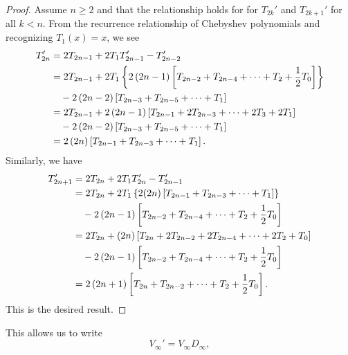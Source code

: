 \begin{proof}
Assume $n\ge2$ and that the relationship holds for
for $T_{2k}'$ and $T_{2k+1}'$ for all $k<n$.
From the recurrence relationship of Chebyshev polynomials
and recognizing $T_{1}(x) = x$,
we see
%
\begin{align}
    T_{2n}' &= 2T_{2n-1} + 2T_{1}T_{2n-1}' - T_{2n-2}' \nonumber\\
    &= 2T_{2n-1} + 2T_{1}\left\{ 
        2\left( 2n-1 \right)\left[ T_{2n-2} + T_{2n-4} + \cdots + T_{2} +
        \frac{1}{2}T_{0} \right] \right\}
        \nonumber\\
        &\quad - 2\left( 2n-2 \right)\left[ T_{2n-3} + T_{2n-5} + \cdots + T_{1} \right]
        \nonumber\\
    &= 2T_{2n-1} + 2\left( 2n-1 \right)\left[ T_{2n-1} + 2T_{2n-3} + \cdots
        + 2T_{3} + 2T_{1} \right] \nonumber\\
        &\quad - 2\left( 2n-2 \right)\left[ T_{2n-3} + T_{2n-5} + \cdots + T_{1} \right]
        \nonumber\\
    &= 2\left( 2n \right)\left[ T_{2n-1} + T_{2n-3} + \cdots + T_{1} \right].
\end{align}
%
Similarly, we have
%
\begin{align}
    T_{2n+1}' &= 2T_{2n} + 2T_{1}T_{2n}' - T_{2n-1}' \nonumber\\
        &= 2T_{2n} + 2T_{1}\left\{ 2(2n)\left[ T_{2n-1} + T_{2n-3}
            + \cdots + T_{1} \right] \right\} \nonumber\\
    &\quad - 2\left( 2n-1 \right)\left[ T_{2n-2} + T_{2n-4} + \cdots + T_{2}
        + \frac{1}{2}T_{0} \right] \nonumber\\
    &= 2T_{2n} + (2n)\left[ T_{2n} + 2T_{2n-2} + 2T_{2n-4} + \cdots
        + 2T_{2} + T_{0} \right] \nonumber\\
    &\quad - 2\left( 2n-1 \right)\left[ T_{2n-2} + T_{2n-4} + \cdots + T_{2}
        + \frac{1}{2}T_{0} \right] \nonumber\\
    &= 2\left( 2n+1 \right)\left[ T_{2n} + T_{2n-2} + \cdots + T_{2} +
        \frac{1}{2}T_{0} \right].
\end{align}
%
This is the desired result.
\end{proof}



This allows us to write
%
\begin{equation}
    V_{\infty}' = V_{\infty}D_{\infty},
\end{equation}

